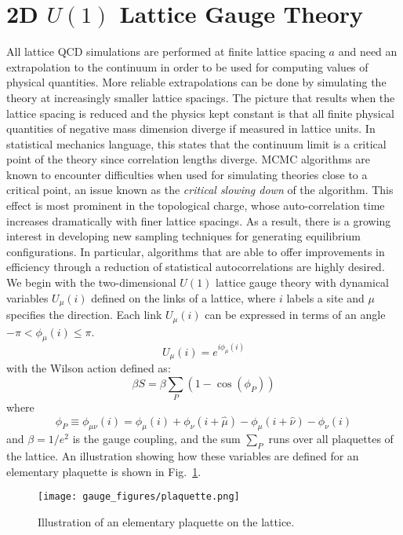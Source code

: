 \documentclass[../main.tex]{subfiles}
\begin{document}
\section{2D \texorpdfstring{$U(1)$}{U (1)} Lattice Gauge Theory}%
\label{sec:l2hmc_u1} 
All lattice QCD simulations are performed at finite
lattice spacing $a$ and need an extrapolation to the continuum in order to be
used for computing values of physical quantities.
%
More reliable extrapolations can be done by simulating the theory at
increasingly smaller lattice spacings.
%
The picture that results when the lattice spacing is reduced and the physics
kept constant is that all finite physical quantities of negative mass dimension
diverge if measured in lattice units.
%
In statistical mechanics language, this states that the continuum limit is a
critical point of the theory since correlation lengths diverge.
%
MCMC algorithms are known to encounter difficulties when used for simulating
theories close to a critical point, an issue known as the \emph{critical slowing
down} of the algorithm.
%
This effect is most prominent in the topological charge, whose auto-correlation
time increases dramatically with finer lattice spacings.
%
As a result, there is a growing interest in developing new sampling techniques
for generating equilibrium configurations. 
%
In particular, algorithms that are able to offer improvements in efficiency
through a reduction of statistical autocorrelations are highly desired. 
%
We begin with the two-dimensional $U{(1)}$ lattice gauge theory with dynamical
variables $U_{\mu}{(i)}$ defined on the links of a lattice, where $i$ labels a
site and $\mu$ specifies the direction.
%
Each link $U_{\mu}{(i)}$ can be expressed in terms of an angle $-\pi <
\phi_{\mu}{(i)} \leq \pi$.
%
\begin{equation}
    U_{\mu}{(i)} = e^{i\phi_{\mu}{(i)}}
    \label{eq:link_variable}
\end{equation}
%
with the Wilson action defined as:
%
\begin{equation}
    \beta S = \beta \sum_{P}{(1 - \cos{(\phi_{P})})}
    \label{eq:wilson_action}
\end{equation}
%
where
%
\begin{equation}
    \phi_{P} \equiv \phi_{\mu\nu}(i) = 
        \phi_{\mu}{(i)} + \phi_{\nu}{(i + \hat{\mu})} 
        - \phi_{\mu}{(i + \hat{\nu})} - \phi_{\nu}{(i)}
    \label{eq:phi_plaquette}
\end{equation}
and $\beta = 1/e^{2}$ is the gauge coupling, and the sum $\sum_{P}$ runs over
all plaquettes of the lattice.
%
An illustration showing how these variables are defined for an elementary
plaquette is shown in Fig.~\ref{fig:plaquette}.
%
\begin{figure}[htpb]
  \centering
  \texttt{[image: gauge\_figures/plaquette.png]}
  \caption{Illustration of an elementary plaquette on the lattice.}%
\label{fig:plaquette}
\end{figure}
\end{document}
